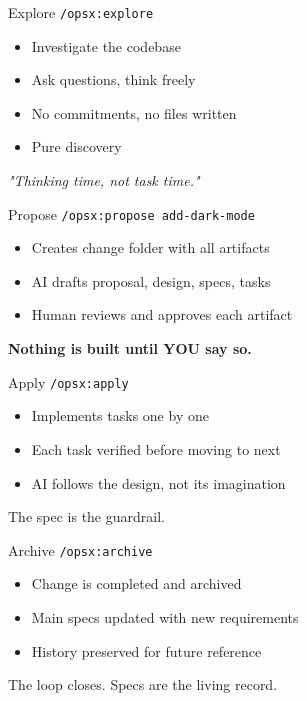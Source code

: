 \documentclass[aspectratio=169,18pt]{beamer}
\begin{document}
\begin{frame}[fragile]{Explore}
  \Large\texttt{/opsx:explore}\\[1em]
  \normalsize
  \begin{itemize}\setlength\itemsep{0.5em}
    \item Investigate the codebase
    \item Ask questions, think freely
    \item No commitments, no files written
    \item Pure discovery
  \end{itemize}
  \vspace{1em}
  \textit{"Thinking time, not task time."}
\end{frame}

\begin{frame}[fragile]{Propose}
  \Large\texttt{/opsx:propose add-dark-mode}\\[1em]
  \normalsize
  \begin{itemize}\setlength\itemsep{0.5em}
    \item Creates change folder with all artifacts
    \item AI drafts proposal, design, specs, tasks
    \item Human reviews and approves each artifact
  \end{itemize}
  \vspace{1em}
  \textbf{Nothing is built until YOU say so.}
\end{frame}

\begin{frame}[fragile]{Apply}
  \Large\texttt{/opsx:apply}\\[1em]
  \normalsize
  \begin{itemize}\setlength\itemsep{0.5em}
    \item Implements tasks one by one
    \item Each task verified before moving to next
    \item AI follows the design, not its imagination
  \end{itemize}
  \vspace{1em}
  The spec is the guardrail.
\end{frame}

\begin{frame}[fragile]{Archive}
  \Large\texttt{/opsx:archive}\\[1em]
  \normalsize
  \begin{itemize}\setlength\itemsep{0.5em}
    \item Change is completed and archived
    \item Main specs updated with new requirements
    \item History preserved for future reference
  \end{itemize}
  \vspace{1em}
  The loop closes. Specs are the living record.
\end{frame}
\end{document}
